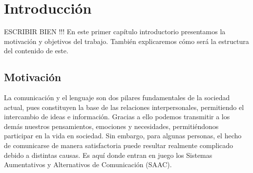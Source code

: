 \documentclass[11pt,spanish,listoffigures,listoftables]{tfgetsinf}
\begin{document}
\begin{abstract}[english]
Augmentative and Alternative Communication (AAC) systems are vital tools for facilitating communication for individuals with difficulties using language. These systems allow users to select pictograms associated with key words that will form the sentence that is wished to communicate. Then, the sentence can be synthesized with a human voice. Recent advances in the field of natural language processing, and specifically the proliferation of large language models, offer new perspectives for improving AAC systems. In particular, this work will explore how these language models can enhance the expressiveness of AAC communication when used to generate natural language from the key words (pictograms) selected by the user. In this way, this work will evaluate the performance of these models when adapted for integration into AAC systems. This evaluation will be carried out using real test sets in spanish and english extracted from the portal of the Aragonese Center for Augmentative and Alternative Communication.
\end{abstract}


\mainmatter


\chapter{Introducción}
ESCRIBIR BIEN !!!
En este primer capítulo introductorio presentamos la motivación y objetivos del trabajo. También explicaremos cómo será la estructura del contenido de este.

\section{Motivación}

La comunicación y el lenguaje son dos pilares fundamentales de la sociedad actual, pues constituyen la base de las relaciones interpersonales, permitiendo el intercambio de ideas e información. Gracias a ello podemos transmitir a los demás nuestros pensamientos, emociones y necesidades, permitiéndonos participar en la vida en sociedad. Sin embargo, para algunas personas, el hecho de comunicarse de manera satisfactoria puede resultar realmente complicado debido a distintas causas. Es aquí donde entran en juego los Sistemas Aumentativos y Alternativos de Comunicación (SAAC).
\end{document}
